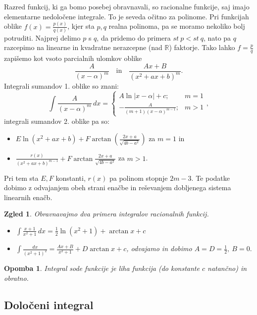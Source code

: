 \documentclass[10pt, a4paper]{article}
\newtheorem*{opomba}{Opomba}
\newtheorem{zgled}[izr]{Zgled}
\newcommand{\R}{\mathbb {R}}
\begin{document}
Razred funkcij, ki ga bomo posebej obravnavali, so racionalne funkcije, saj imajo elementarne nedoločene integrale.
To je seveda očitno za polinome. Pri funkcijah oblike $f(x) = \frac{p(x)}{q(x)}$, kjer sta $p,q$ realna polinoma, pa se moramo nekoliko bolj potruditi.
Najprej delimo $p$ s $q$, da pridemo do primera $st\ p < st\ q$, nato pa $q$ razcepimo na linearne in kvadratne nerazcepne (nad $\R$) faktorje.
Tako lahko $f = \frac{p}{q}$ zapišemo kot vsoto parcialnih ulomkov oblike
$$\frac{A}{(x - \alpha)^m} \quad \text{in} \quad \frac{Ax + B}{(x^2 + ax + b)^m}.$$
Integrali sumandov 1. oblike so znani:
$$\int \frac{A}{(x - \alpha)^m}\,dx = \begin{cases}
    A \ln |x - \alpha| + c ;& m = 1\\
    - \frac{A}{(m + 1)(x - \alpha)^{m - 1}} ;& m > 1
\end{cases},$$
integrali sumandov 2. oblike pa so:
\begin{itemize}
    \item $E \ln (x^2 + ax + b) + F \arctan \left(\frac{2x + a}{\sqrt{4b - a^2}} \right)$ za $m = 1$ in 
    \item $\frac{r(x)}{(x^2 + ax + b)^{m-1}} + F \arctan \frac{2x + a}{\sqrt{4b - a^2}}$ za $m > 1$.
\end{itemize}
Pri tem sta $E,F$ konstanti, $r(x)$ pa polinom stopnje $2m -3$. Te podatke dobimo z odvajanjem obeh strani enačbe in reševanjem dobljenega sistema linearnih enačb.

\begin{zgled}
    Obravnavajmo dva primera integralov racionalnih funkcij.
    \begin{itemize}
        \item $\int \frac{x + 1}{x^2 + 1}\,dx = \frac{1}{2} \ln (x^2 + 1) + \arctan x + c$
        \item $\int \frac{dx}{(x^2 + 1)^2} = \frac{Ax + B}{x^2 + 1} + D \arctan x + c$, odvajamo in dobimo $A=D= \frac{1}{2},\ B = 0.$
    \end{itemize}
\end{zgled}

\begin{opomba}
    Integral sode funkcije je liha funkcija (do konstante $c$ natančno) in obratno.
\end{opomba}

\subsection{Določeni integral}
\end{document}
